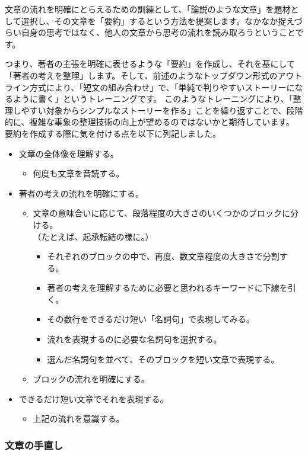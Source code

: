 \documentclass[12pt,a4paper]{jsarticle}
\begin{document}
文章の流れを明確にとらえるための訓練として、「論説のような文章」を題材として選択し、その文章を「要約」するという方法を提案します。なかなか捉えづらい自身の思考ではなく、他人の文章から思考の流れを読み取ろうということです。

つまり、著者の主張を明確に表せるような「要約」を作成し、それを基にして「著者の考えを整理」します。そして、前述のようなトップダウン形式のアウトライン方式により、「短文の組み合わせ」で、「単純で判りやすいストーリーになるように書く」というトレーニングです。
このようなトレーニングにより、「整理しやすい対象からシンプルなストーリーを作る」ことを繰り返すことで、段階的に、複雑な事象の整理技術の向上が望めるのではないかと期待しています。
要約を作成する際に気を付ける点を以下に列記しました。

\begin{itemize}
\item
文章の全体像を理解する。
	\begin{itemize}
	\item
	何度も文章を音読する。
	\end{itemize}
\item
著者の考えの流れを明確にする。
	\begin{itemize}
	\item
	文章の意味合いに応じて、段落程度の大きさのいくつかのブロックに分ける。\\
	（たとえば、起承転結の様に。）
		\begin{itemize}
		\item
		それぞれのブロックの中で、再度、数文章程度の大きさで分割する。
		\item
		著者の考えを理解するために必要と思われるキーワードに下線を引く。
		\item
		その数行をできるだけ短い「名詞句」で表現してみる。
		\item
		流れを表現するのに必要な名詞句を選択する。
		\item
		選んだ名詞句を並べて、そのブロックを短い文章で表現する。
		\end{itemize}
	\item
	ブロックの流れを明確にする。
	\end{itemize}
\item
できるだけ短い文章でそれを表現する。
	\begin{itemize}
	\item
	上記の流れを意識する。
	\end{itemize}
\end{itemize}


\subsubsection{文章の手直し}
\end{document}

